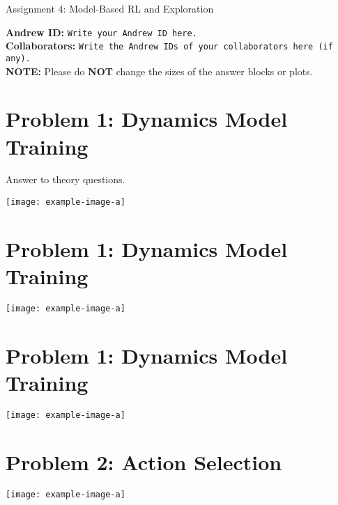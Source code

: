 \documentclass{article}
\begin{document}

\begin{centering}
    {\Large Assignment 4: Model-Based RL and Exploration
} \\
    \vspace{.25cm}
\end{centering}
\vspace{0.25cm}

\textbf{Andrew ID:} \texttt{Write your Andrew ID here.} \\
\textbf{Collaborators:} \texttt{Write the Andrew IDs of your collaborators here (if any).}\\ 
\textbf{NOTE:} Please do \textbf{NOT} change the sizes of the answer blocks or plots.

\setcounter{section}{0}
\section{Problem 1: Dynamics Model Training}
Answer to theory questions.\\
\begin{answer}[title=Plot 1,height=9.5cm,width=\linewidth]
\centering
\texttt{[image: example-image-a]}
\end{answer}

\setcounter{section}{0}
\section{Problem 1: Dynamics Model Training}
\begin{answer}[title=Plot 2,height=9.5cm,width=\linewidth]
\centering
\texttt{[image: example-image-a]}
\end{answer}

\setcounter{section}{0}
\section{Problem 1: Dynamics Model Training}
\begin{answer}[title=Plot 3,height=9.5cm,width=\linewidth]
\centering
\texttt{[image: example-image-a]}
\end{answer}

\section{Problem 2: Action Selection}
\begin{answer}[title=Plot 1,height=9.5cm,width=\linewidth]
\centering
\texttt{[image: example-image-a]}
\end{answer}
\end{document}
